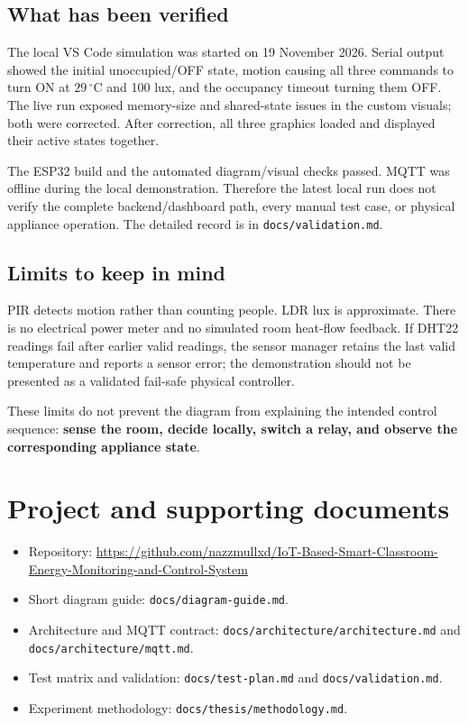 \documentclass[11pt,a4paper]{article}
\newcommand{\temp}[1]{\ensuremath{#1\,^{\circ}\mathrm{C}}}
\newcommand{\file}[1]{\nolinkurl{#1}}
\begin{document}
\subsection{What has been verified}
The local VS Code simulation was started on 19 November 2026.
Serial output showed the initial unoccupied/OFF state, motion causing
all three commands to turn ON at \temp{29} and 100 lux, and the
occupancy timeout turning them OFF. The live run exposed memory-size
and shared-state issues in the custom visuals; both were corrected.
After correction, all three graphics loaded and displayed their active
states together.

The ESP32 build and the automated diagram/visual checks passed.
MQTT was offline during the local demonstration. Therefore the latest
local run does not verify the complete backend/dashboard path, every
manual test case, or physical appliance operation. The detailed record
is in \file{docs/validation.md}.

\subsection{Limits to keep in mind}
PIR detects motion rather than counting people. LDR lux is approximate.
There is no electrical power meter and no simulated room heat-flow
feedback. If DHT22 readings fail after earlier valid readings, the
sensor manager retains the last valid temperature and reports a sensor
error; the demonstration should not be presented as a validated
fail-safe physical controller.

These limits do not prevent the diagram from explaining the intended
control sequence: \textbf{sense the room, decide locally, switch a relay,
and observe the corresponding appliance state}.

\section*{Project and supporting documents}
\begin{itemize}
  \item Repository:
  \url{https://github.com/nazzmullxd/IoT-Based-Smart-Classroom-Energy-Monitoring-and-Control-System}
  \item Short diagram guide: \file{docs/diagram-guide.md}.
  \item Architecture and MQTT contract:
  \file{docs/architecture/architecture.md} and
  \file{docs/architecture/mqtt.md}.
  \item Test matrix and validation:
  \file{docs/test-plan.md} and \file{docs/validation.md}.
  \item Experiment methodology:
  \file{docs/thesis/methodology.md}.
\end{itemize}
\end{document}
